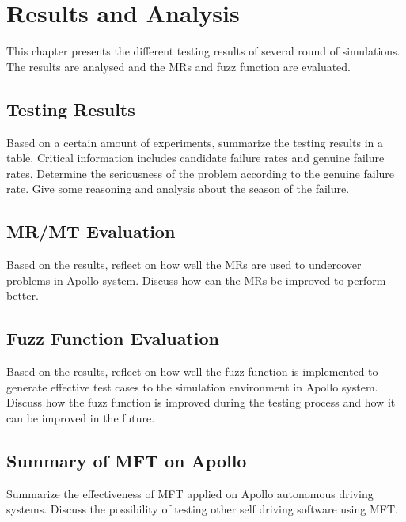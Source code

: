 \chapter{Results and Analysis}
\label{ch:result}

This chapter presents the different testing results of several round of simulations. The results are analysed and the MRs and fuzz function are evaluated.

\section{Testing Results}
Based on a certain amount of experiments, summarize the testing results in a table. Critical information includes candidate failure rates and genuine failure rates. Determine the seriousness of the problem according to the genuine failure rate. Give some reasoning and analysis about the season of the failure.

\section{MR/MT Evaluation}
Based on the results, reflect on how well the MRs are used to undercover problems in Apollo system. Discuss how can the MRs be improved to perform better.

\section{Fuzz Function Evaluation}
Based on the results, reflect on how well the fuzz function is implemented to generate effective test cases to the simulation environment in Apollo system. Discuss how the fuzz function is improved during the testing process and how it can be improved in the future.

\section{Summary of MFT on Apollo}
Summarize the effectiveness of MFT applied on Apollo autonomous driving systems. Discuss the possibility of testing other self driving software using MFT.